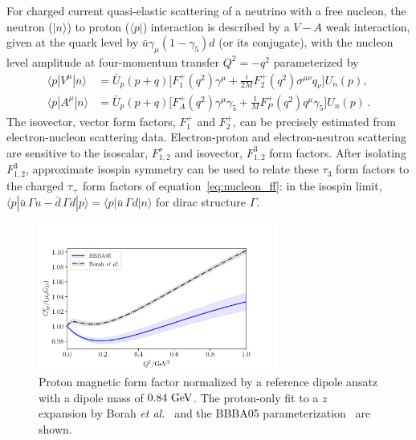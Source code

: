 For charged current quasi-elastic scattering of a neutrino with a free nucleon,
the neutron ($|n\rangle$) to proton ($\langle p|$)
interaction is described by a $V-A$ weak interaction, given at the quark level by
$\bar{u}\gamma_\mu(1- \gamma_5)d$ (or its conjugate), with the nucleon level amplitude at four-momentum transfer $Q^2 = -q^2$ parameterized by
\begin{align}\label{eq:nucleon_ff}
\langle p | V^\mu | n \rangle
    &= \bar{U}_p(p+q) \Big[
        F_1^+(q^2) \gamma^\mu
        +\frac{i}{2M} F_2^+(q^2) \sigma^{\mu\nu} q_\nu
    \Big] U_n(p),
\nonumber\\
\langle p | A^\mu | n \rangle
    &= \bar{U}_p(p+q) \Big[
        F_A^+(q^2) \gamma^\mu \gamma_5
        +\frac{1}{M} F_P^+(q^2) q^\mu \gamma_5
    \Big] U_n(p)\, .
\end{align}
The isovector, vector form factors, $F_1^+$ and $F_2^+$, can be precisely estimated from electron-nucleon scattering data.
Electron-proton and electron-neutron scattering are sensitive to the isoscalar, $F_{1,2}^s$ and isovector, $F_{1,2}^3$ form factors.  After isolating $F_{1,2}^3$, approximate isospin symmetry can be used to relate these $\tau_3$ form factors to the charged $\tau_+$ form factors of equation~\eqref{eq:nucleon_ff}: in the isospin limit, $\langle p| \bar{u}\, \Gamma u - \bar{d}\, \Gamma d |p\rangle = \langle p| \bar{u}\, \Gamma d |n\rangle$ for dirac structure $\Gamma$.

\begin{figure}
 \centering
 \includegraphics[width=0.7\textwidth]{plots/proton_magnetic-standalone.pdf}
\caption{
Proton magnetic form factor normalized by a reference dipole ansatz
with a dipole mass of $0.84~{\rm GeV}$.
The proton-only fit to a $z$ expansion by Borah {\it et al.}~\cite{Borah:2020gte}
and the BBBA05 parameterization~\cite{Bradford:2006yz} are shown.
\label{fig:protonmagneticff}
}
\end{figure}

